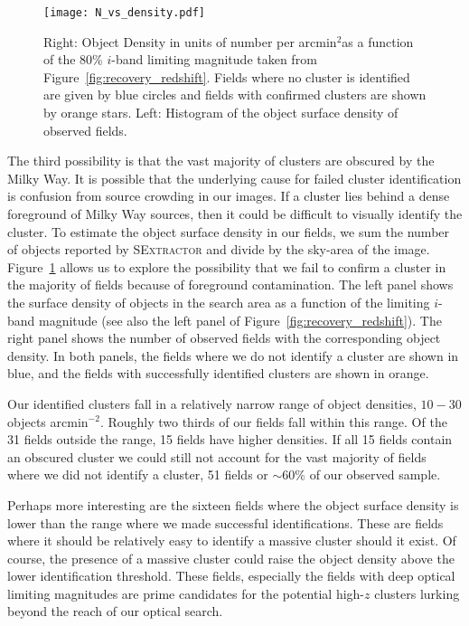 \documentclass[apj, revtex4-1]{emulateapj}
\newcommand{\sdssi}{\hbox{$i$}}
\newcommand{\arcminsq}{\hbox{arcmin$^2$}}
\newcommand{\perarcminsq}{\hbox{arcmin$^{-2}$}}
\begin{document}
\begin{figure}
	\texttt{[image: N\_vs\_density.pdf]}
	\caption{Right: Object Density in units of number per \arcminsq as a function of the 80\% \sdssi-band limiting magnitude taken from Figure~\ref{fig:recovery_redshift}. Fields where no cluster is identified are given by blue circles and fields with confirmed clusters are shown by orange stars. Left: Histogram of the object surface density of observed fields.}
	\label{fig:N_vs_density}
\end{figure}

The third possibility is that the vast majority of clusters are obscured by the Milky Way. It is possible that the underlying cause for failed cluster identification is confusion from source crowding in our images. If a cluster lies behind a dense foreground of Milky Way sources, then it could be difficult to visually identify the cluster. To estimate the object surface density in our fields, we sum the number of objects reported by \textsc{SExtractor} and divide by the sky-area of the image. Figure~\ref{fig:N_vs_density} allows us to explore the possibility that we fail to confirm a cluster in the majority of fields because of foreground contamination. The left panel shows the surface density of objects in the search area as a function of the limiting \sdssi-band magnitude (see also the left panel of Figure~\ref{fig:recovery_redshift}). The right panel shows the number of observed fields with the corresponding object density. In both panels, the fields where we do not identify a cluster are shown in blue, and the fields with successfully identified clusters are shown in orange.

Our identified clusters fall in a relatively narrow range of object densities, $10-30$ objects \perarcminsq. Roughly two thirds of our fields fall within this range. Of the 31 fields outside the range, 15 fields have higher densities. If all 15 fields contain an obscured cluster we could still not account for the vast majority of fields where we did not identify a cluster, 51 fields or $\sim60\%$ of our observed sample.

Perhaps more interesting are the sixteen fields where the object surface density is lower than the range where we made successful identifications. These are fields where it should be relatively easy to identify a massive cluster should it exist. Of course, the presence of a massive cluster could raise the object density above the lower identification threshold. These fields, especially the fields with deep optical limiting magnitudes are prime candidates for the potential high-$z$ clusters lurking beyond the reach of our optical search.
\end{document}

